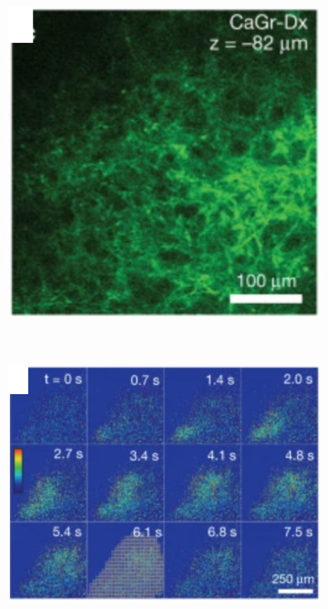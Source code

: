 \begin{figure}[h!]
	\begin{subfigure}{0.3\linewidth}
		\includegraphics[width = \textwidth]{images/introduction/calcium1}
		\caption{} 
	\end{subfigure}
~
	\begin{subfigure}{0.4\linewidth}
		\includegraphics[width = \textwidth]{images/introduction/calcium2}
		\caption{} 
	\end{subfigure}

\end{figure}
